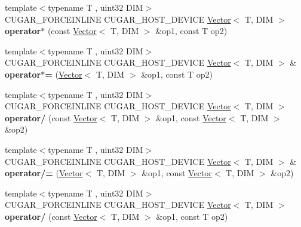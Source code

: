 \begin{DoxyCompactItemize}
\item 
\mbox{\label{namespacecugar_ad0db3a75f5ef3073b815beba77de558c}} 
{\footnotesize template$<$typename T , uint32 D\+IM$>$ }\\C\+U\+G\+A\+R\+\_\+\+F\+O\+R\+C\+E\+I\+N\+L\+I\+NE C\+U\+G\+A\+R\+\_\+\+H\+O\+S\+T\+\_\+\+D\+E\+V\+I\+CE \hyperlink{structcugar_1_1_vector}{Vector}$<$ T, D\+IM $>$ {\bfseries operator$\ast$} (const \hyperlink{structcugar_1_1_vector}{Vector}$<$ T, D\+IM $>$ \&op1, const T op2)
\item 
\mbox{\label{namespacecugar_a8722b76b6a1f89e6c7f5559b520b745f}} 
{\footnotesize template$<$typename T , uint32 D\+IM$>$ }\\C\+U\+G\+A\+R\+\_\+\+F\+O\+R\+C\+E\+I\+N\+L\+I\+NE C\+U\+G\+A\+R\+\_\+\+H\+O\+S\+T\+\_\+\+D\+E\+V\+I\+CE \hyperlink{structcugar_1_1_vector}{Vector}$<$ T, D\+IM $>$ \& {\bfseries operator$\ast$=} (\hyperlink{structcugar_1_1_vector}{Vector}$<$ T, D\+IM $>$ \&op1, const T op2)
\item 
\mbox{\label{namespacecugar_abac535c3f78449d10c226727e5753e6a}} 
{\footnotesize template$<$typename T , uint32 D\+IM$>$ }\\C\+U\+G\+A\+R\+\_\+\+F\+O\+R\+C\+E\+I\+N\+L\+I\+NE C\+U\+G\+A\+R\+\_\+\+H\+O\+S\+T\+\_\+\+D\+E\+V\+I\+CE \hyperlink{structcugar_1_1_vector}{Vector}$<$ T, D\+IM $>$ {\bfseries operator/} (const \hyperlink{structcugar_1_1_vector}{Vector}$<$ T, D\+IM $>$ \&op1, const \hyperlink{structcugar_1_1_vector}{Vector}$<$ T, D\+IM $>$ \&op2)
\item 
\mbox{\label{namespacecugar_a718bc76cbdd5e9ac5b8ab370725fd5b5}} 
{\footnotesize template$<$typename T , uint32 D\+IM$>$ }\\C\+U\+G\+A\+R\+\_\+\+F\+O\+R\+C\+E\+I\+N\+L\+I\+NE C\+U\+G\+A\+R\+\_\+\+H\+O\+S\+T\+\_\+\+D\+E\+V\+I\+CE \hyperlink{structcugar_1_1_vector}{Vector}$<$ T, D\+IM $>$ \& {\bfseries operator/=} (\hyperlink{structcugar_1_1_vector}{Vector}$<$ T, D\+IM $>$ \&op1, const \hyperlink{structcugar_1_1_vector}{Vector}$<$ T, D\+IM $>$ \&op2)
\item 
\mbox{\label{namespacecugar_a0e67859a66515787047e800b00e0f219}} 
{\footnotesize template$<$typename T , uint32 D\+IM$>$ }\\C\+U\+G\+A\+R\+\_\+\+F\+O\+R\+C\+E\+I\+N\+L\+I\+NE C\+U\+G\+A\+R\+\_\+\+H\+O\+S\+T\+\_\+\+D\+E\+V\+I\+CE \hyperlink{structcugar_1_1_vector}{Vector}$<$ T, D\+IM $>$ {\bfseries operator/} (const \hyperlink{structcugar_1_1_vector}{Vector}$<$ T, D\+IM $>$ \&op1, const T op2)

\end{DoxyCompactItemize}
